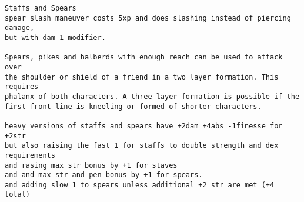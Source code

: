 \goodbreak \small \begin{samepage} \begin{verbatim}
Staffs and Spears
spear slash maneuver costs 5xp and does slashing instead of piercing damage,
but with dam-1 modifier.

Spears, pikes and halberds with enough reach can be used to attack over
the shoulder or shield of a friend in a two layer formation. This requires
phalanx of both characters. A three layer formation is possible if the
first front line is kneeling or formed of shorter characters.

heavy versions of staffs and spears have +2dam +4abs -1finesse for +2str
but also raising the fast 1 for staffs to double strength and dex requirements
and rasing max str bonus by +1 for staves
and and max str and pen bonus by +1 for spears.
and adding slow 1 to spears unless additional +2 str are met (+4 total)


\end{verbatim}
\end{samepage}
